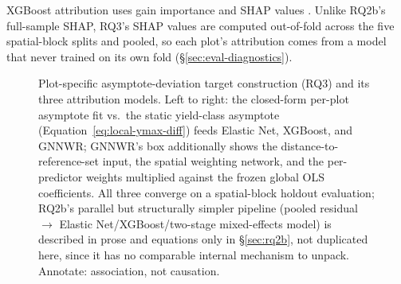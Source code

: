 {XGBoost attribution uses gain importance and SHAP values \citep{lundberg2017}. Unlike RQ2b's full-sample SHAP, RQ3's SHAP values are computed out-of-fold across the five spatial-block splits and pooled, so each plot's attribution comes from a model that never trained on its own fold (\S\ref{sec:eval-diagnostics}).

\begin{figure}[!htbp]
\centering
{}
\caption{Plot-specific asymptote-deviation target construction (RQ3) and its three attribution
models. Left to right: the closed-form per-plot asymptote fit vs.\ the static yield-class
asymptote (Equation~\ref{eq:local-ymax-diff}) feeds Elastic Net, XGBoost, and GNNWR; GNNWR's box
additionally shows the distance-to-reference-set input, the spatial weighting network, and the
per-predictor weights multiplied against the frozen global OLS coefficients. All three converge on
a spatial-block holdout evaluation; RQ2b's parallel but structurally simpler pipeline (pooled
residual $\to$ Elastic Net/XGBoost/two-stage mixed-effects model) is described in prose and
equations only in \S\ref{sec:rq2b}, not duplicated here, since it has no comparable internal
mechanism to unpack. Annotate: association, not causation.}
\label{fig:rq3-attribution}
\end{figure}

}
